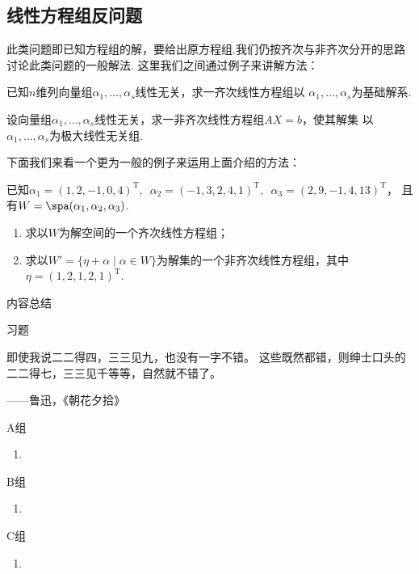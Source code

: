 \subsection{线性方程组反问题}

此类问题即已知方程组的解，要给出原方程组.我们仍按齐次与非齐次分开的思路讨论此类问题的一般解法.
这里我们之间通过例子来讲解方法：
\begin{example}
    已知$n$维列向量组$\alpha_1,\ldots,\alpha_s$线性无关，求一齐次线性方程组以
    $\alpha_1,\ldots,\alpha_s$为基础解系.
\end{example}
\begin{solution}

\end{solution}

\begin{example}
    设向量组$\alpha_1,\ldots,\alpha_s$线性无关，求一非齐次线性方程组$AX=b$，使其解集
    以$\alpha_1,\ldots,\alpha_s$为极大线性无关组.
\end{example}
\begin{solution}

\end{solution}

下面我们来看一个更为一般的例子来运用上面介绍的方法：
\begin{example}
    已知$\alpha_1=(1,2,-1,0,4)^\mathrm{T},\enspace\alpha_2=(-1,3,2,4,1)^\mathrm{T},\enspace\alpha_3=(2,9,-1,4,13)^\mathrm{T}$，
    且有$W=\spa(\alpha_1,\alpha_2,\alpha_3)$.
    \begin{enumerate}
        \item 求以$W$为解空间的一个齐次线性方程组；

        \item 求以$W'=\{\eta+\alpha \mid \alpha\in W\}$为解集的一个非齐次线性方程组，其中$\eta=(1,2,1,2,1)^\mathrm{T}$.
    \end{enumerate}
\end{example}
\begin{solution}

\end{solution}

\vspace{2ex}
\centerline{\heiti \Large 内容总结}

\vspace{2ex}

\centerline{\heiti \Large 习题}
\vspace{2ex}
{\kaishu 即使我说二二得四，三三见九，也没有一字不错。
这些既然都错，则绅士口头的二二得七，三三见千等等，自然就不错了。}
\begin{flushright}
    \kaishu
    ——鲁迅，《朝花夕拾》
\end{flushright}
\centerline{\heiti A组}
\begin{enumerate}
    \item
\end{enumerate}
\centerline{\heiti B组}
\begin{enumerate}
    \item
\end{enumerate}
\centerline{\heiti C组}
\begin{enumerate}
    \item
\end{enumerate}
